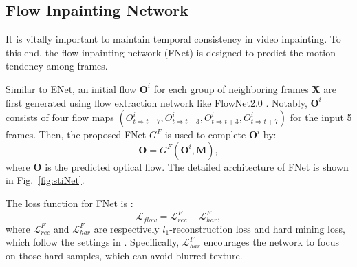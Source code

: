 \subsection{Flow Inpainting Network}

It is vitally important to maintain temporal consistency in video inpainting.
To this end, the flow inpainting network (FNet)  is designed to predict the motion tendency among frames.

Similar to ENet, an initial flow \(\boldsymbol{O}^i\) for each group of neighboring frames $\boldsymbol{X}$ are first generated using flow extraction network like FlowNet2.0 \cite{Flownet_2017_CVPR}.
Notably, \(\boldsymbol{O}^i\) consists of four flow maps \((O^i_{t\Rightarrow t-7},O^i_{t\Rightarrow t-3},O^i_{t\Rightarrow t+3},O^i_{t\Rightarrow t+7})\) for the input 5 frames.
Then, the proposed FNet $G^F$ is used to complete \(\boldsymbol{O}^i\) by:
\begin{equation}
\label{eq:flownet}
\boldsymbol{O}=G^F(\boldsymbol{O}^{i},\boldsymbol{M}),
\end{equation}
where $\boldsymbol{O}$ is the predicted optical flow.
%
The detailed architecture of FNet is shown in Fig.~\ref{fig:stiNet}.

The loss function for FNet is :
\begin{equation}
\label{eq:flow_all}
\mathcal{L}_{flow}=\mathcal{L}^F_{rec}+ \mathcal{L}^F_{har},
\end{equation}
where $\mathcal{L}^F_{rec}$ and $\mathcal{L}^F_{har}$ are respectively $l_1$-reconstruction loss and hard mining loss, which follow the settings in \cite{Xu_2019_CVPR}. Specifically, $\mathcal{L}^F_{har}$ encourages the network to focus on those hard samples, which can avoid blurred texture.
%

